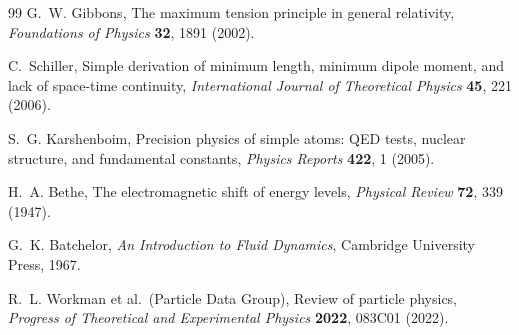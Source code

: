 \documentclass[aps,pra,preprint,longbibliography,nofootinbib]{revtex4-2}
\begin{document}
\begin{thebibliography}{99}
G.~W. Gibbons,
The maximum tension principle in general relativity,
\textit{Foundations of Physics} \textbf{32}, 1891 (2002).

C.~Schiller,
Simple derivation of minimum length, minimum dipole moment, and
lack of space-time continuity,
\textit{International Journal of Theoretical Physics} \textbf{45},
221 (2006).

S.~G. Karshenboim,
Precision physics of simple atoms: QED tests, nuclear structure, and
fundamental constants,
\textit{Physics Reports} \textbf{422}, 1 (2005).

H.~A. Bethe,
The electromagnetic shift of energy levels,
\textit{Physical Review} \textbf{72}, 339 (1947).

G.~K. Batchelor,
\textit{An Introduction to Fluid Dynamics},
Cambridge University Press, 1967.

R.~L. Workman et al.\ (Particle Data Group),
Review of particle physics,
\textit{Progress of Theoretical and Experimental Physics}
\textbf{2022}, 083C01 (2022).

\end{thebibliography}
\end{document}
